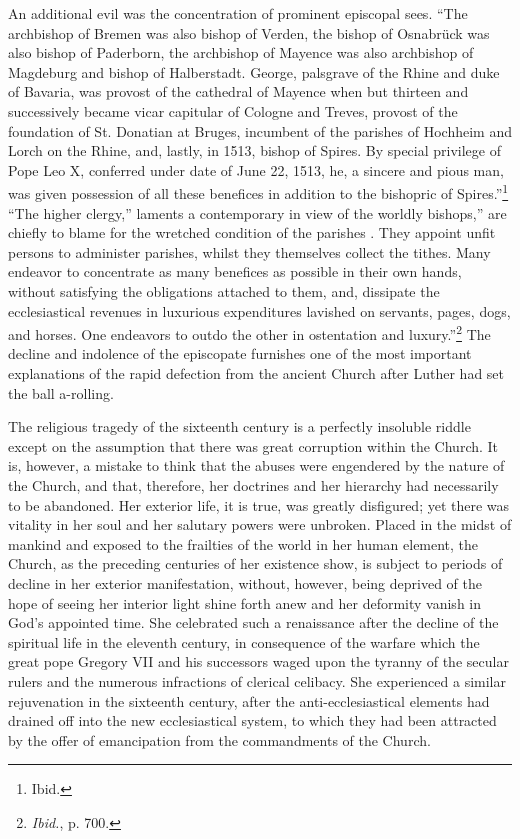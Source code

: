 An additional evil was the concentration of prominent episcopal
sees. “The archbishop of Bremen was also bishop of Verden, the
bishop of Osnabrück was also bishop of Paderborn, the archbishop of Mayence
was also archbishop of Magdeburg and bishop of
Halberstadt. George, palsgrave of the Rhine and duke of Bavaria,
was provost of the cathedral of Mayence when but thirteen and
successively became vicar capitular of Cologne and Treves, provost
of the foundation of St. Donatian at Bruges, incumbent of the parishes
of Hochheim and Lorch on the Rhine, and, lastly, in 1513,
bishop of Spires. By special privilege of Pope Leo X, conferred under
date of June 22, 1513, he, a sincere and pious man, was given possession
of all these benefices in addition to the bishopric of Spires.”\footnote{Ibid.}
“The higher clergy,” laments a contemporary in view of the worldly
bishops,” are chiefly to blame for the wretched condition of the parishes
. They appoint unfit persons to administer parishes, whilst they
themselves collect the tithes. Many endeavor to concentrate as many
benefices as possible in their own hands, without satisfying the obligations
attached to them, and, dissipate the ecclesiastical revenues in
luxurious expenditures lavished on servants, pages, dogs, and horses.
One endeavors to outdo the other in ostentation and luxury.”\footnote{\textit{Ibid.}, p. 700.}
The decline and indolence of the episcopate furnishes one of the most
important explanations of the rapid defection from the ancient Church
after Luther had set the ball a-rolling.

The religious tragedy of the sixteenth century is a perfectly insoluble
riddle except on the assumption that there was great corruption within
the Church. It is, however, a mistake to think that the
abuses were engendered by the nature of the Church, and that,
therefore, her doctrines and her hierarchy had necessarily to be
abandoned. Her exterior life, it is true, was greatly disfigured; yet
there was vitality in her soul and her salutary powers were unbroken.
Placed in the midst of mankind and exposed to the frailties of the
world in her human element, the Church, as the preceding centuries
of her existence show, is subject to periods of decline in her exterior
manifestation, without, however, being deprived of the hope of seeing
her interior light shine forth anew and her deformity vanish in God’s
appointed time. She celebrated such a renaissance after the decline of
the spiritual life in the eleventh century, in consequence of the warfare
which the great pope Gregory VII and his successors waged upon the
tyranny of the secular rulers and the numerous infractions of clerical
celibacy. She experienced a similar rejuvenation in the sixteenth
century, after the anti-ecclesiastical elements had drained off into the
new ecclesiastical system, to which they had been attracted by the
offer of emancipation from the commandments of the Church.
